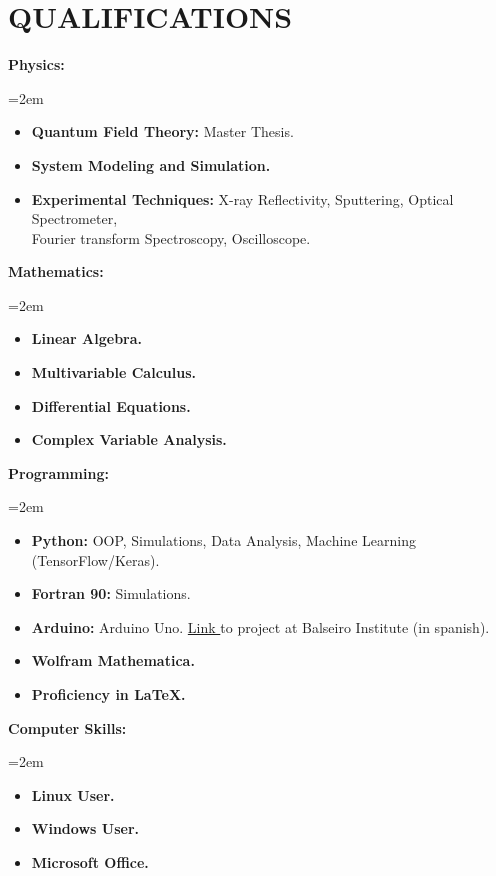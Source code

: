 \documentclass[paper=letter,fontsize=11pt]{scrartcl} %
\newcommand{\sepspace}{\vspace*{1em}}		%
\newcommand{\NewPart}[2]{\section*{\uppercase{#1} \small \normalfont #2}}
\newcommand{\WorkEntry}[5]{
		\noindent \textbf{#1}
        \noindent \small \textit{#2}
        \hfill      %
        \colorbox{White}{%
			\parbox{6em}{%
			\hfill\color{Black}#3}} \par  %
		\noindent \textit{#4} \par        %
		\noindent\hangindent=2em\hangafter=0 \small #5 %
		\normalsize \par}
\begin{document}
\NewPart{QUALIFICATIONS}{}



\sepspace

\WorkEntry{Physics:}{}{}{}{
\begin{itemize}
\item \textbf{Quantum Field Theory:} Master Thesis.
\item \textbf{System Modeling and Simulation.}
\item \textbf{Experimental Techniques:} X-ray Reflectivity, Sputtering, Optical Spectrometer, \\ Fourier transform Spectroscopy, Oscilloscope.
\end{itemize}
}

\sepspace

\WorkEntry{Mathematics:}{}{}{}{
\begin{itemize}
\item \textbf{Linear Algebra.}
\item \textbf{Multivariable Calculus.}
\item \textbf{Differential Equations.}
\item \textbf{Complex Variable Analysis.} 
\end{itemize}
}

\sepspace

\WorkEntry{Programming:}{}{}{}{
\begin{itemize}
\item \textbf{Python:} OOP, Simulations, Data Analysis, Machine Learning (TensorFlow/Keras).
\item \textbf{Fortran 90:} Simulations.
\item \textbf{Arduino:} Arduino Uno. {\href{https://drive.google.com/drive/folders/1y01BjDnIPS2QOX3Vo68r9A8HA9tstj1S}{Link }} to project at Balseiro Institute (in spanish).
\item \textbf{Wolfram Mathematica.} 
\item \textbf{Proficiency in LaTeX.}
\end{itemize}
}

\sepspace

\WorkEntry{Computer Skills:}{}{}{}{
\begin{itemize}
\item \textbf{Linux User.}
\item \textbf{Windows User.}
\item \textbf{Microsoft Office.}
\end{itemize}
}
\end{document}
